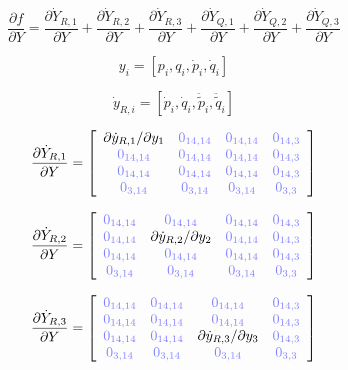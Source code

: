 \documentclass[a4paper,10pt]{article}
\newcommand{\zm}[1]{\ensuremath{ {\color{opaqueblue} 0_{#1} } }}
\begin{document}
\begin{equation}
\frac{\partial f}{\partial Y}
         =  \frac{\partial\dot{Y}_{R,1}}{\partial Y} + \frac{\partial\dot{Y}_{R,2}}{\partial Y} + \frac{\partial\dot{Y}_{R,3}}{\partial Y}
              + \frac{\partial\dot{Y}_{Q,1}}{\partial Y} + \frac{\partial\dot{Y}_{Q,2}}{\partial Y} + \frac{\partial\dot{Y}_{Q,3}}{\partial Y}
\end{equation}


\begin{equation}
y_{i} = [p_i, q_i, \dot{p}_i, \dot{q}_i]
\end{equation}

\begin{equation}
\dot{y}_{R,i} = [\dot{p}_i, \dot{q}_i, \ddot{\tilde{p}}_i, \ddot{\tilde{q}}_i]
\end{equation}



\begin{equation}
\frac{\partial\dot{Y}_{R,1}}{\partial Y}=
\left[ \begin{array}{cccc}
\partial \dot{y}_{R,1} / \partial y_1 & \zm{14,14} & \zm{14,14} & \zm{14,3}\\
\zm{14,14}                            & \zm{14,14} & \zm{14,14} & \zm{14,3}\\
\zm{14,14}                            & \zm{14,14} & \zm{14,14} & \zm{14,3}\\
\zm{3,14}                             & \zm{3,14}  & \zm{3,14}  & \zm{3,3}\\
\end{array} \right]
\end{equation}

\begin{equation}
\frac{\partial\dot{Y}_{R,2}}{\partial Y}=
\left[ \begin{array}{cccc}
\zm{14,14} & \zm{14,14}                            & \zm{14,14} & \zm{14,3}\\
\zm{14,14} & \partial \dot{y}_{R,2} / \partial y_2 & \zm{14,14} & \zm{14,3}\\
\zm{14,14} & \zm{14,14}                            & \zm{14,14} & \zm{14,3}\\
\zm{3,14}  & \zm{3,14}                             & \zm{3,14}  & \zm{3,3}\\
\end{array}  \right]
\end{equation}

\begin{equation}
\frac{\partial\dot{Y}_{R,3}}{\partial Y}=
\left[ \begin{array}{cccc}
\zm{14,14} & \zm{14,14} & \zm{14,14}                            & \zm{14,3}\\
\zm{14,14} & \zm{14,14} & \zm{14,14}                            & \zm{14,3}\\
\zm{14,14} & \zm{14,14} & \partial \dot{y}_{R,3} / \partial y_3 & \zm{14,3}\\
\zm{3,14}  & \zm{3,14}  & \zm{3,14}                             & \zm{3,3}\\
\end{array}  \right]
\end{equation}
\end{document}
